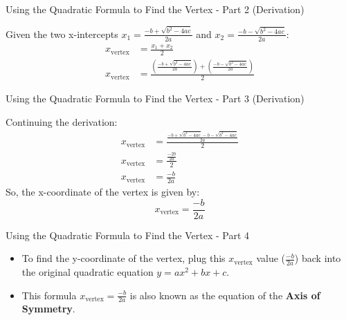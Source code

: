 \documentclass[aspectratio=169]{beamer}
\begin{document}
\begin{frame}{Using the Quadratic Formula to Find the Vertex - Part 2 (Derivation)}
    \begin{tcolorbox}[colback=lightgray,colframe=primary,title=Derivation of Vertex Formula]
        \footnotesize
        Given the two x-intercepts $x_1 = \frac{-b + \sqrt{b^2 - 4ac}}{2a}$ and $x_2 = \frac{-b - \sqrt{b^2 - 4ac}}{2a}$:
        \begin{align*}
            x_{\text{vertex}} &= \frac{x_1 + x_2}{2} \\
            x_{\text{vertex}} &= \frac{\left(\frac{-b + \sqrt{b^2 - 4ac}}{2a}\right) + \left(\frac{-b - \sqrt{b^2 - 4ac}}{2a}\right)}{2}
        \end{align*}
    \end{tcolorbox}
\end{frame}

\begin{frame}{Using the Quadratic Formula to Find the Vertex - Part 3 (Derivation)}
    \begin{tcolorbox}[colback=lightgray,colframe=primary,title=Derivation of Vertex Formula (Cont.)]
        \footnotesize
        Continuing the derivation:
        \begin{align*}
            x_{\text{vertex}} &= \frac{\frac{-b + \sqrt{b^2 - 4ac} - b - \sqrt{b^2 - 4ac}}{2a}}{2} \\
            x_{\text{vertex}} &= \frac{\frac{-2b}{2a}}{2} \\
            x_{\text{vertex}} &= \frac{-b}{2a}
        \end{align*}
        So, the x-coordinate of the vertex is given by:
        \[ x_{\text{vertex}} = \frac{-b}{2a} \]
    \end{tcolorbox}
\end{frame}

\begin{frame}{Using the Quadratic Formula to Find the Vertex - Part 4}
    \begin{tcolorbox}[colback=lightgray,colframe=primary,title=Finding the Y-coordinate]
        \footnotesize
        \begin{itemize}
            \item To find the y-coordinate of the vertex, plug this $x_{\text{vertex}}$ value ($\frac{-b}{2a}$) back into the original quadratic equation $y = ax^2 + bx + c$.
            \item This formula $x_{\text{vertex}} = \frac{-b}{2a}$ is also known as the equation of the \textbf{Axis of Symmetry}.
        \end{itemize}
    \end{tcolorbox}
\end{frame}
\end{document}

